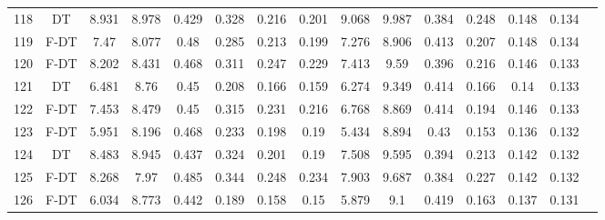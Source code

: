 \begin{longtable}{@{\hskip3pt}c@{\hskip3pt}c@{\hskip3pt}c@{\hskip3pt}c@{\hskip3pt}c@{\hskip3pt}c@{\hskip3pt}c@{\hskip3pt}c@{\hskip3pt}c@{\hskip3pt}c@{\hskip3pt}c@{\hskip3pt}c@{\hskip3pt}c@{\hskip3pt}c@{\hskip3pt}c}
        118 &             DT &             8.931 &          8.978 &           0.429 &           0.328 &           0.216 &           0.201 &               9.068 &           9.987 &           0.384 &         0.248 &          0.148 &           0.134 \\
        119 &           F-DT &              7.47 &          8.077 &            0.48 &           0.285 &           0.213 &           0.199 &               7.276 &           8.906 &           0.413 &         0.207 &          0.148 &           0.134 \\
        120 &           F-DT &             8.202 &          8.431 &           0.468 &           0.311 &           0.247 &           0.229 &               7.413 &            9.59 &           0.396 &         0.216 &          0.146 &           0.133 \\
        121 &             DT &             6.481 &           8.76 &            0.45 &           0.208 &           0.166 &           0.159 &               6.274 &           9.349 &           0.414 &         0.166 &           0.14 &           0.133 \\
        122 &           F-DT &             7.453 &          8.479 &            0.45 &           0.315 &           0.231 &           0.216 &               6.768 &           8.869 &           0.414 &         0.194 &          0.146 &           0.133 \\
        123 &           F-DT &             5.951 &          8.196 &           0.468 &           0.233 &           0.198 &            0.19 &               5.434 &           8.894 &            0.43 &         0.153 &          0.136 &           0.132 \\
        124 &             DT &             8.483 &          8.945 &           0.437 &           0.324 &           0.201 &            0.19 &               7.508 &           9.595 &           0.394 &         0.213 &          0.142 &           0.132 \\
        125 &           F-DT &             8.268 &           7.97 &           0.485 &           0.344 &           0.248 &           0.234 &               7.903 &           9.687 &           0.384 &         0.227 &          0.142 &           0.132 \\
        126 &           F-DT &             6.034 &          8.773 &           0.442 &           0.189 &           0.158 &            0.15 &               5.879 &             9.1 &           0.419 &         0.163 &          0.137 &           0.131 \\

\end{longtable}
